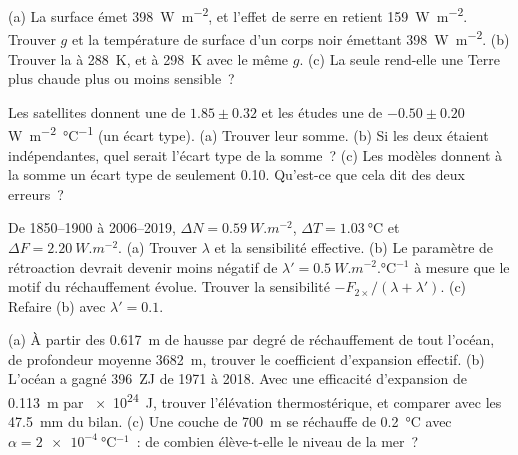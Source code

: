 \begin{exercise}[$\star\star$]\label{exo:b2:anthropogenic-climate-change:5}
(a) La surface émet \qty{398}{W.m^{-2}}, et l'effet de serre en retient \qty{159}{W.m^{-2}}.
Trouver $g$ et la température de surface d'un corps noir émettant \qty{398}{W.m^{-2}}. (b)
Trouver la  à \qty{288}{K}, et à \qty{298}{K} avec le même $g$. (c) La
seule  rend-elle une Terre plus chaude plus ou moins sensible~?
\end{exercise}

\begin{exercise}[$\star\star$]\label{exo:b2:anthropogenic-climate-change:6}
Les satellites donnent une  de $1.85 \pm 0.32$ et les études une  de $-0.50 \pm 0.20$ \unit{W.m^{-2}.\celsius^{-1}} (un écart type). (a) Trouver leur
somme. (b) Si les deux étaient indépendantes, quel serait l'écart type de la somme~? (c) Les modèles
donnent à la somme un écart type de seulement \num{0.10}. Qu'est-ce que cela dit des deux erreurs~?
\end{exercise}

\begin{exercise}[$\star\star$]\label{exo:b2:anthropogenic-climate-change:7}
De 1850--1900 à 2006--2019, $\Delta N = \qty{0.59}{W.m^{-2}}$, $\Delta T = \qty{1.03}{\celsius}$
et $\Delta F = \qty{2.20}{W.m^{-2}}$. (a) Trouver $\lambda$ et la sensibilité effective. (b) Le
paramètre de rétroaction devrait devenir moins négatif de
$\lambda' = \qty{0.5}{W.m^{-2}.\celsius^{-1}}$ à mesure que le motif du réchauffement évolue.
Trouver la sensibilité $-F_{2\times}/(\lambda + \lambda')$. (c) Refaire (b) avec $\lambda' = 0.1$.
\end{exercise}

\begin{exercise}[$\star\star$]\label{exo:b2:anthropogenic-climate-change:8}
(a) À partir des \qty{0.617}{m} de hausse par degré de réchauffement de tout l'océan, de profondeur moyenne
\qty{3682}{m}, trouver le coefficient d'expansion effectif. (b) L'océan a gagné \qty{396}{ZJ} de 1971 à 2018.
Avec une efficacité d'expansion de \qty{0.113}{m} par \qty{e24}{J}, trouver l'élévation thermostérique, et
comparer avec les \qty{47.5}{mm} du bilan. (c) Une couche de \qty{700}{m} se réchauffe de \qty{0.2}{\celsius}
avec $\alpha = \qty{2e-4}{\celsius^{-1}}$~: de combien élève-t-elle le niveau de la mer~?
\end{exercise}

